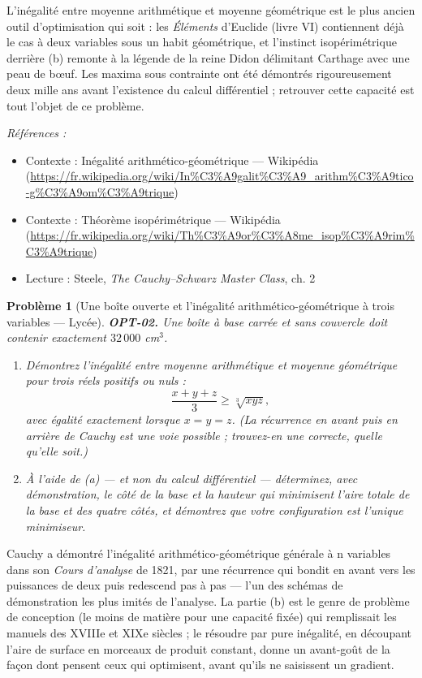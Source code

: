 \documentclass[11pt]{article}
\newtheorem{problem}{Problème}
\newenvironment{refs}{\par\small\noindent\emph{Références :}\begin{itemize}\setlength\itemsep{0pt}}{\end{itemize}\normalsize}
\begin{document}
\noindent L'inégalité entre moyenne arithmétique et moyenne géométrique est le plus ancien outil d'optimisation qui soit : les \textit{Éléments} d'Euclide (livre VI) contiennent déjà le cas à deux variables sous un habit géométrique, et l'instinct isopérimétrique derrière (b) remonte à la légende de la reine Didon délimitant Carthage avec une peau de b\oe{}uf. Les maxima sous contrainte ont été démontrés rigoureusement deux mille ans avant l'existence du calcul différentiel ; retrouver cette capacité est tout l'objet de ce problème.

\begin{refs}
\item Contexte : Inégalité arithmético-géométrique --- Wikipédia (\url{https://fr.wikipedia.org/wiki/In%C3%A9galit%C3%A9_arithm%C3%A9tico-g%C3%A9om%C3%A9trique})
\item Contexte : Théorème isopérimétrique --- Wikipédia (\url{https://fr.wikipedia.org/wiki/Th%C3%A9or%C3%A8me_isop%C3%A9rim%C3%A9trique})
\item Lecture : Steele, \textit{The Cauchy--Schwarz Master Class}, ch. 2
\end{refs}

\bigskip

\begin{problem}[{Une boîte ouverte et l'inégalité arithmético-géométrique à trois variables --- Lycée}]
\textbf{OPT-02.} Une boîte à base carrée et sans couvercle doit contenir exactement $32\,000$ cm$^3$.
\begin{enumerate}
\item[(a)] Démontrez l'inégalité entre moyenne arithmétique et moyenne géométrique pour trois réels positifs ou nuls :
\[ \frac{x+y+z}{3} \ge \sqrt[3]{xyz}, \]
avec égalité exactement lorsque $x = y = z$. (La récurrence en avant puis en arrière de Cauchy est une voie possible ; trouvez-en une correcte, quelle qu'elle soit.)
\item[(b)] À l'aide de (a) --- et non du calcul différentiel --- déterminez, avec démonstration, le côté de la base et la hauteur qui minimisent l'aire totale de la base et des quatre côtés, et démontrez que votre configuration est l'unique minimiseur.
\end{enumerate}

\end{problem}

\noindent Cauchy a démontré l'inégalité arithmético-géométrique générale à n variables dans son \textit{Cours d'analyse} de 1821, par une récurrence qui bondit en avant vers les puissances de deux puis redescend pas à pas --- l'un des schémas de démonstration les plus imités de l'analyse. La partie (b) est le genre de problème de conception (le moins de matière pour une capacité fixée) qui remplissait les manuels des XVIIIe et XIXe siècles ; le résoudre par pure inégalité, en découpant l'aire de surface en morceaux de produit constant, donne un avant-goût de la façon dont pensent ceux qui optimisent, avant qu'ils ne saisissent un gradient.
\end{document}
